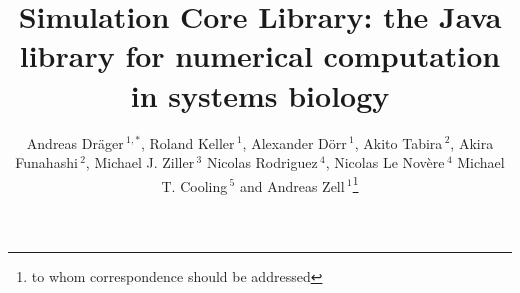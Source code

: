 \documentclass{bioinfo}
\begin{document}

\title[Simulation Core Library]{Simulation Core Library: the Java
library for numerical computation in systems biology} \author[Dr\"ager
\textit{et~al.}]{%
Andreas Dr\"ager\,$^{1,*}$, Roland Keller\,$^{1}$, 
Alexander D\"orr\,$^{1}$,
Akito Tabira\,$^{2}$,
Akira Funahashi\,$^{2}$,
Michael J. Ziller\,$^{3}$
Nicolas Rodriguez\,$^{4}$,
Nicolas Le Nov\`{e}re\,$^{4}$
Michael T. Cooling\,$^{5}$ and
Andreas Zell\,$^1$\footnote{to whom correspondence should be addressed}}
\address{$^{1}$Center for Bioinformatics Tuebingen (ZBIT), University of
Tuebingen, T\"ubingen, Germany\\
$^{2}$Keio University, Graduate School of Science and Technology, Yokohama,
Japan\\
$^{3}$Department of Stem Cell and Regenerative Biology, Harvard University,
Cambridge, MA, USA\\
$^{4}$European Bioinformatics Institute, Wellcome Trust Genome Campus,
Hinxton, Cambridge, UK\\
$^{5}$Auckland Bioengineering Institute, University of Auckland, Auckland, New
Zealand}



\maketitle
\end{document}
